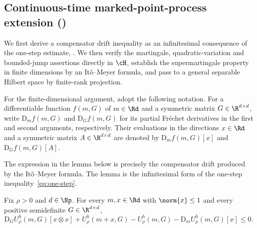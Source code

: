 \documentclass[11pt]{article}
\let\cref\zcref
\begin{document}
\subsection{Continuous-time marked-point-process extension (\cref{prop:continuous-bounded-jumps})}
\label{sec:proof-continuous-bounded-jumps}
We first derive a compensator drift inequality as an infinitesimal consequence of the one-step estimate, \cref{eq:one-step}. We then verify the martingale, quadratic-variation and bounded-jump assertions directly in $\cH$, establish the supermartingale property in finite dimensions by an Itô--Meyer formula,\footnotemark{} and pass to a general separable Hilbert space by finite-rank projection.



For the finite-dimensional argument, adopt the following notation. For a differentiable function $f(m,G)$ of $m\in\Rd$ and a symmetric matrix $G\in\R^{d\times d}$, write $\mathrm{D}_m f(m,G)$ and $\mathrm{D}_G f(m,G)$ for its partial Fréchet derivatives in the first and second arguments, respectively. Their evaluations in the directions $x\in\Rd$ and a symmetric matrix $A\in\R^{d\times d}$ are denoted by $\mathrm{D}_m f(m,G)[x]$ and $\mathrm{D}_G f(m,G)[A]$.

The expression in the lemma below is precisely the compensator drift produced by the Itô--Meyer formula. The lemma is the infinitesimal form of the one-step inequality~\eqref{eq:one-step}.
\begin{lemma}\label{lem:continuous-jump-drift}
Fix $\rho>0$ and $d\in\Np$. For every $m,x\in\Rd$ with $\norm{x}\leq1$ and every positive semidefinite $G\in\R^{d\times d}$,
\[
  \mathrm{D}_G U_\rho^h(m,G)[x\otimes x]+U_\rho^h(m+x,G)-U_\rho^h(m,G)-\mathrm{D}_m U_\rho^h(m,G)[x]\leq0.
\]
\end{lemma}
\end{document}
